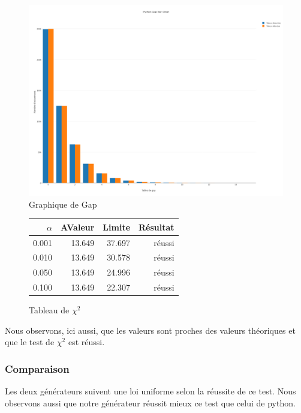 \documentclass[10pt,a4paper]{article}
\begin{document}
\newpage

\begin{figure}[h]
\centering
\includegraphics[scale=0.25]{../chart_images/python_gap_bar_chart.png}
\caption{Graphique de Gap}
\end{figure}

\begin{figure}[h]
	\centering
	\begin{tabular}{|r|r|r|r|}
		\hline
		$\alpha$ & AValeur & Limite & Résultat\\
		\hline
		0.001 & 13.649 & 37.697 & réussi\\
		0.010 & 13.649 & 30.578 & réussi\\
		0.050 & 13.649 & 24.996 & réussi\\
		0.100 & 13.649 & 22.307 & réussi\\
		\hline
	\end{tabular}
	\caption{Tableau de $\chi^2$}
\end{figure}


Nous observons, ici aussi, que les valeurs sont proches des valeurs théoriques et que le test de $\chi^2$  est réussi.

\subsubsection{Comparaison}

Les deux générateurs suivent une loi uniforme selon la réussite de ce test. 
Nous observons aussi que notre générateur réussit mieux ce test que celui de python.

\newpage
\end{document}
